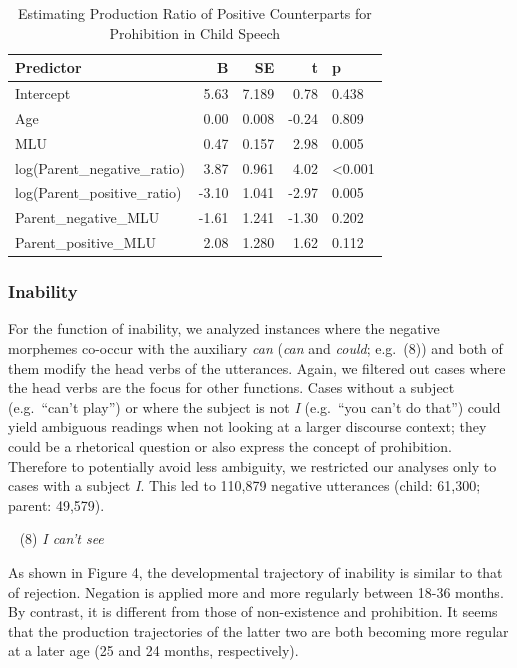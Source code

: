 \documentclass[
  english,
  man,floatsintext]{apa6}
\begin{document}
\begin{table}

\caption{\label{tab:unnamed-chunk-4}Estimating Production Ratio of Positive Counterparts for Prohibition in Child Speech}
\centering
\begin{tabular}[t]{l|r|r|r|l}
\hline
Predictor & B & SE & t & p\\
\hline
Intercept & 5.63 & 7.189 & 0.78 & 0.438\\
\hline
Age & 0.00 & 0.008 & -0.24 & 0.809\\
\hline
MLU & 0.47 & 0.157 & 2.98 & 0.005\\
\hline
log(Parent\_negative\_ratio) & 3.87 & 0.961 & 4.02 & <0.001\\
\hline
log(Parent\_positive\_ratio) & -3.10 & 1.041 & -2.97 & 0.005\\
\hline
Parent\_negative\_MLU & -1.61 & 1.241 & -1.30 & 0.202\\
\hline
Parent\_positive\_MLU & 2.08 & 1.280 & 1.62 & 0.112\\
\hline
\end{tabular}
\end{table}

\clearpage

\hypertarget{inability}{%
\subsubsection{Inability}\label{inability}}

For the function of inability, we analyzed instances where the negative morphemes co-occur with the auxiliary \emph{can} (\emph{can} and \emph{could}; e.g.~(8)) and both of them modify the head verbs of the utterances. Again, we filtered out cases where the head verbs are the focus for other functions. Cases without a subject (e.g.~\enquote{can't play}) or where the subject is not \emph{I} (e.g.~\enquote{you can't do that}) could yield ambiguous readings when not looking at a larger discourse context; they could be a rhetorical question or also express the concept of prohibition. Therefore to potentially avoid less ambiguity, we restricted our analyses only to cases with a subject \emph{I}. This led to 110,879 negative utterances (child: 61,300; parent: 49,579).

~
(8) \emph{I can't see}

As shown in Figure 4, the developmental trajectory of inability is similar to that of rejection. Negation is applied more and more regularly between 18-36 months. By contrast, it is different from those of non-existence and prohibition. It seems that the production trajectories of the latter two are both becoming more regular at a later age (25 and 24 months, respectively).
\end{document}
